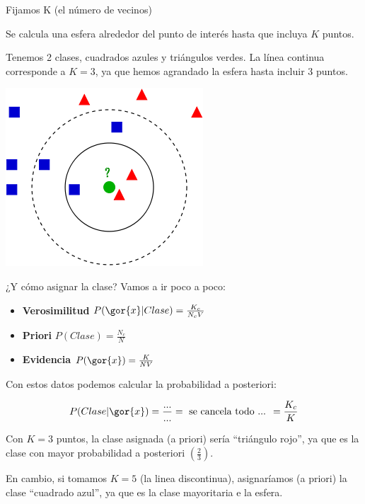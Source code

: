 \documentclass{apuntes}
\begin{document}
\begin{defn}
Fijamos K (el número de vecinos)

Se calcula una esfera alrededor del punto de interés hasta que incluya $K$ puntos.
\end{defn}

\begin{example}
Tenemos 2 clases, cuadrados azules y triángulos verdes. La línea continua corresponde a $K=3$, ya que hemos agrandado la esfera hasta incluir 3 puntos.

\begin{center}
\includegraphics[scale=0.7]{img/VecinosProximos.png}
\end{center}

¿Y cómo asignar la clase? Vamos a ir poco a poco:

\begin{itemize}
	\item \textbf{Verosimilitud} $P(\gor{x} | Clase) = \frac{K_c}{N_cV}$
	\item \textbf{Priori} $P(Clase) = \frac{N_c}{N}$
	\item \textbf{Evidencia} $P(\gor{x}) = \frac{K}{NV}$
\end{itemize}

Con estos datos podemos calcular la probabilidad a posteriori:

\[
P(Clase | \gor{x}) = \frac{...}{...} = \text{ se cancela todo ... } = \frac{K_c}{K}
\]

Con $K=3$ puntos, la clase asignada (a priori) sería ``triángulo rojo'', ya que es la clase con mayor probabilidad a posteriori $\left( \frac{2}{3} \right)$.

En cambio, si tomamos $K=5$ (la linea discontinua), asignaríamos (a priori) la clase ``cuadrado azul'', ya que es la clase mayoritaria e la esfera.

\end{example}
\end{document}
